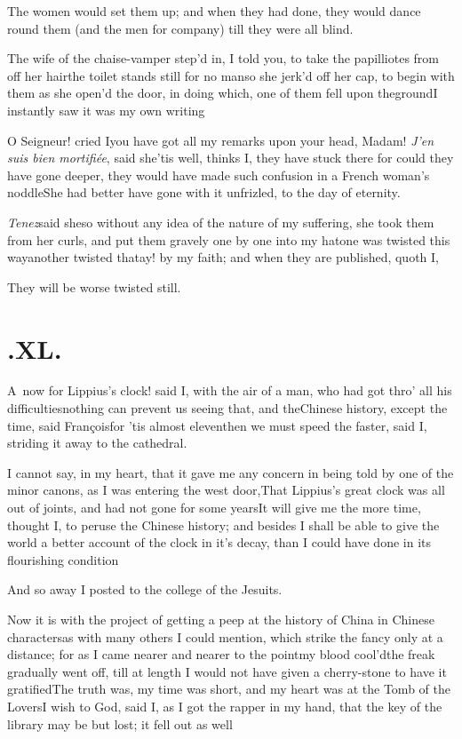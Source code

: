 \documentclass{article}
\begin{document}
The women would set them up; and when they had done, they would
dance round them (and the men for company) till they were all
blind.

The wife of the chaise-vamper step’d in, I told you, to
take the papilliotes from off her hair\tsh the toilet
stands still for no man\tsh so she jerk’d off her
cap, to begin with them as she open’d the door, in doing
which, one of them fell upon the\pb ground\tsk I instantly saw it was my own
writing\tsh

O Seigneur! cried I\tsk you have got all my remarks upon your
head, Madam!\break
\tsh \textit{J’en suis bien
mortifiée}, said she\tsh ’tis well, thinks
I, they have stuck there\break
\tsk for could they have gone deeper,
they would have made such confusion in a French
woman’s noddle\tsk She had better have gone with it
unfrizled, to the day of eternity.

\textit{Tenez}\tsk said she\tsk so without any idea of the
nature of my suffering, she took them from her curls, and put them
gravely one by one into my hat\tsh one was twisted this
way\tsh another twisted that\tsh ay! by my faith;
and when they are published, quoth I,\tsh

They will be worse twisted still.

\newpage
\section{.\enspace XL.}

\lettrine{A}{\,} now for Lippius’s
clock! said I, with the air of a man, who had got thro’ all
his difficulties\tsh nothing can prevent us seeing that,
and the\break Chinese history, \etc except the time,\break
said François\tsh for ’tis almost
eleven\tsk then we must speed the faster, said I, striding it
away to the cathedral.

I cannot say, in my heart, that it gave me any concern in being
told by one of the minor canons, as I was entering the west
door,\tsk That Lippius’s great clock was all out of
joints, and had not gone for some years\tsh It will give
me the more time, thought I, to peruse the Chinese history;
and besides I shall be able to give the world a better account of
the\pb
clock in it’s decay, than I could have done in its flourishing
condition\tsh

\tsh And so away I posted to the college of the
Jesuits.

Now it is with the project of getting a peep at the history of
China in Chinese characters\tsk as with many others
I could mention, which strike the fancy only at a distance; for as
I came nearer and nearer to the point\tsk my blood
cool’d\tsk the freak gradually went off, till at length I
would not have given a cherry-stone to have it gratified\tsh The truth was, my time was
short, and my heart was at the Tomb of the Lovers\tsh I
wish to God, said I, as I got the rapper in my hand, that the key
of the library may be but lost; it fell out as
well\tsh
\end{document}
